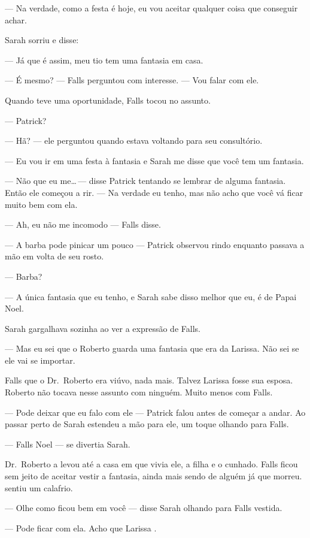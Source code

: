 --- Na verdade, como a festa é hoje, eu vou aceitar qualquer coisa que conseguir achar.

Sarah sorriu e disse:

--- Já que é assim, meu tio tem uma fantasia em casa.

--- É mesmo? --- Falls perguntou com interesse. --- Vou falar com ele.

Quando teve uma oportunidade, Falls tocou no assunto.

--- Patrick?

--- Hã? --- ele perguntou quando estava voltando para seu consultório.

--- Eu vou ir em uma festa à fantasia e Sarah me disse que você tem um fantasia.

--- Não que eu me\ldots\,--- disse Patrick tentando se lembrar de alguma fantasia. Então ele começou a rir. --- Na verdade eu tenho, mas não acho que você vá ficar muito bem com ela.

--- Ah, eu não me incomodo --- Falls disse.

--- A barba pode pinicar um pouco --- Patrick observou rindo enquanto passava a mão em volta de seu rosto.

--- Barba?

--- A única fantasia que eu tenho, e Sarah sabe disso melhor que eu, é de Papai Noel.

Sarah gargalhava sozinha ao ver a expressão de Falls.

--- Mas eu sei que o Roberto guarda uma fantasia que era da Larissa. Não sei se ele vai se importar.

Falls  que o Dr.~Roberto era viúvo, nada mais. Talvez Larissa fosse sua esposa. Roberto não tocava nesse assunto com ninguém. Muito menos com Falls.

--- Pode deixar que eu falo com ele --- Patrick falou antes de começar a andar. Ao passar perto de Sarah estendeu a mão para ele,  um toque olhando para Falls.

--- Falls Noel --- se divertia Sarah.

Dr.~Roberto a levou até a casa em que vivia ele, a filha e o cunhado. Falls ficou sem jeito de aceitar vestir a fantasia, ainda mais sendo de alguém já que morreu.  sentiu um calafrio.

--- Olhe como ficou bem em você --- disse Sarah olhando para Falls vestida.

--- Pode ficar com ela. Acho que Larissa .

